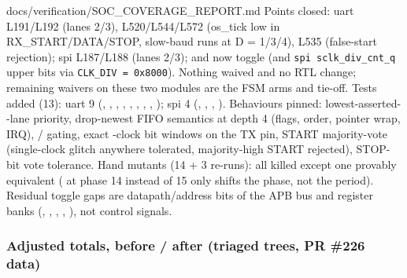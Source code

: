 \begin{relocated}{docs/verification/SOC_COVERAGE_REPORT.md}
Points closed: uart L191/L192 (lanes 2/3),
L520/\allowbreak{}L544/\allowbreak{}L572  (os\_tick low in
RX\_\allowbreak{}START/\allowbreak{}DATA/\allowbreak{}STOP, slow-baud
runs at D = 1/3/4), L535  (false-start rejection); spi
L187/L188 (lanes 2/3);  and
 now toggle (and
\texttt{spi\ sclk\_\allowbreak{}div\_\allowbreak{}cnt\_\allowbreak{}q}
upper bits via \texttt{CLK\_\allowbreak{}DIV\ =\allowbreak{}\ 0x8000}).
Nothing waived and no RTL change; remaining waivers on these two modules
are the FSM  arms and  tie-off. Tests added
(13): uart 9 (,
, ,
, ,
, ,
, ); spi 4
(, ,
, ).
Behaviours pinned: lowest-asserted--lane priority,
drop-newest FIFO semantics at depth 4 (flags, order, pointer wrap, IRQ),
/ gating, exact -clock bit
windows on the TX pin, START majority-vote (single-clock glitch anywhere
tolerated, majority-high START rejected), STOP-bit vote tolerance. Hand
mutants (14 + 3 re-runs): all killed except one provably equivalent
( at phase 14 instead of 15 only shifts the phase, not
the period). Residual toggle gaps are datapath/\allowbreak{}address bits
of the APB bus and register banks (, ,
, , ), not control signals.

\subsubsection{Adjusted totals, before / after (triaged trees, PR \#226
data)}\label{tm:flow:soc-coverage-report:adjusted-totals-before-after-triaged-trees-pr-226-data}


\end{relocated}
